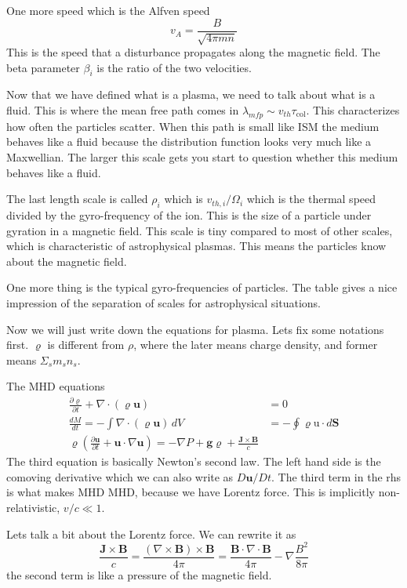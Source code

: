 \documentclass[letterpaper, 11pt]{article}
\numberwithin{equation}{section}
\numberwithin{figure}{section}
\begin{document}
One more speed which is the Alfven speed
\begin{equation}
  \label{eq:4}
  v_A = \frac{B}{\sqrt{4\pi mn}}
\end{equation}
This is the speed that a disturbance propagates along the magnetic field. The
beta parameter $\beta_i$ is the ratio of the two velocities.

Now that we have defined what is a plasma, we need to talk about what is a
fluid. This is where the mean free path comes in $\lambda_{mfp}\sim
v_{th}\tau_\mathrm{col}$. This characterizes how often the particles scatter.
When this path is small like ISM the medium behaves like a fluid because the
distribution function looks very much like a Maxwellian. The larger this scale
gets you start to question whether this medium behaves like a fluid.

The last length scale is called $\rho_i$ which is $v_{th,i} / \Omega_i$ which is
the thermal speed divided by the gyro-frequency of the ion. This is the size of
a particle under gyration in a magnetic field. This scale is tiny compared to
most of other scales, which is characteristic of astrophysical plasmas. This
means the particles know about the magnetic field.

One more thing is the typical gyro-frequencies of particles. The table gives a
nice impression of the separation of scales for astrophysical situations.

Now we will just write down the equations for plasma. Lets fix some notations
first. $\varrho$ is different from $\rho$, where the later means charge density,
and former means $\Sigma_sm_sn_s$.

The MHD equations
\begin{align}
  \frac{\partial\varrho}{\partial t} + \nabla\cdot(\varrho \mathbf{u}) &= 0 \\
  \frac{dM}{dt} = -\int \nabla\cdot(\varrho \mathbf{u})\,dV &= -\oint \varrho \mathrm{u}\cdot d\mathbf{S} \\
  \varrho \left( \frac{\partial \mathbf{u}}{\partial t} + \mathbf{u}\cdot \nabla \mathbf{u} \right) = -\nabla P + \mathbf{g}\varrho + \frac{\mathbf{J}\times\mathbf{B}}{c}
\end{align}
The third equation is basically Newton's second law. The left hand side is the
comoving derivative which we can also write as $D \mathbf{u}/Dt$. The third term
in the rhs is what makes MHD MHD, because we have Lorentz force. This is
implicitly non-relativistic, $v/c\ll 1$.

Lets talk a bit about the Lorentz force. We can rewrite it as
\begin{equation}
  \label{eq:5}
  \frac{\mathbf{J}\times \mathbf{B}}{c} = \frac{(\nabla\times \mathbf{B}) \times \mathbf{B}}{4\pi} = \frac{\mathbf{B}\cdot \nabla\cdot \mathbf{B}}{4\pi} - \nabla \frac{B^2}{8\pi}
\end{equation}
the second term is like a pressure of the magnetic field.
\end{document}
